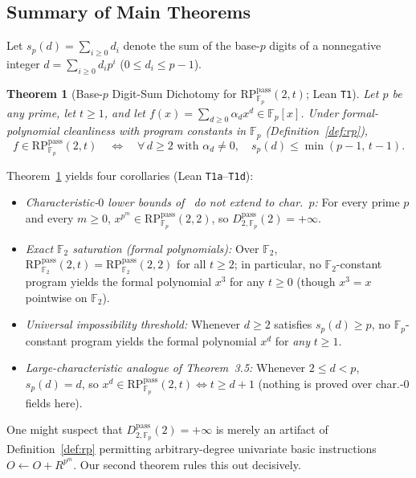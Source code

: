 \documentclass[11pt,reqno]{amsart}
\newtheorem{theorem}{Theorem}[section]
\theoremstyle{definition}
\newcommand{\F}{\mathbb{F}}
\newcommand{\RP}{\mathrm{RP}}
\newcommand{\pass}{\mathrm{pass}}
\begin{document}
\subsection{Summary of Main Theorems}

Let $s_p(d) = \sum_{i \ge 0} d_i$ denote the sum of the base-$p$ digits of a nonnegative integer $d = \sum_{i \ge 0} d_i p^i$ ($0 \le d_i \le p-1$).

\begin{theorem}[Base-$p$ Digit-Sum Dichotomy for $\RP_{\F_p}^{\pass}(2, t)$; Lean \texttt{T1}]
\label{thm:T1}
Let $p$ be any prime, let $t \ge 1$, and let $f(x) = \sum_{d \ge 0} \alpha_d x^d \in \F_p[x]$.
Under formal-polynomial cleanliness with program constants in $\F_p$ (Definition~\ref{def:rp}),
\[
  f \in \RP_{\F_p}^{\pass}(2, t)
  \quad\Longleftrightarrow\quad
  \forall\, d \ge 2 \text{ with } \alpha_d \neq 0,\quad s_p(d) \le \min(p - 1,\, t - 1).
\]
\end{theorem}

Theorem~\ref{thm:T1} yields four corollaries (Lean \texttt{T1a}--\texttt{T1d}):
\begin{itemize}
  \item \emph{Characteristic-$0$ lower bounds of~\cite[Thms.\ 3.2, 3.3, 3.5]{Vinciguerra2026} do not extend to char.\ $p$:} For every prime $p$ and every $m \ge 0$, $x^{p^m} \in \RP_{\F_p}^{\pass}(2, 2)$, so $D_{2,\F_p}^{\pass}(2) = +\infty$.
  \item \emph{Exact $\F_2$ saturation (formal polynomials):} Over $\F_2$, $\RP_{\F_2}^{\pass}(2, t) = \RP_{\F_2}^{\pass}(2, 2)$ for all $t \ge 2$; in particular, no $\F_2$-constant program yields the formal polynomial $x^3$ for any $t \ge 0$ (though $x^3 = x$ pointwise on $\F_2$).
  \item \emph{Universal impossibility threshold:} Whenever $d \ge 2$ satisfies $s_p(d) \ge p$, no $\F_p$-constant program yields the formal polynomial $x^d$ for \emph{any} $t \ge 1$.
  \item \emph{Large-characteristic analogue of Theorem~3.5:} Whenever $2 \le d < p$, $s_p(d) = d$, so $x^d \in \RP_{\F_p}^{\pass}(2, t) \iff t \ge d + 1$ (nothing is proved over char.-$0$ fields here).
\end{itemize}

One might suspect that $D_{2,\F_p}^{\pass}(2) = +\infty$ is merely an artifact of Definition~\ref{def:rp} permitting arbitrary-degree univariate basic instructions $O \leftarrow O + R^{p^m}$.
Our second theorem rules this out decisively.
\end{document}

